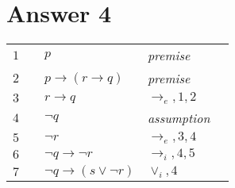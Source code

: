 \documentclass[12pt]{article}
\begin{document}
\section*{Answer 4}
\begin{table}[H]
    \centering
    \begin{tabular}{*5{l}}
         $1$ & & $p$ & \textit{premise} & \\
         $2$ & & $p \rightarrow (r \rightarrow q)$ & \textit{premise} & \\
         $3$ & & $r \rightarrow q$ & $\rightarrow_e, 1, 2$ & \\
          
         \cline{2-5}
         $4$ & \multicolumn{1}{|c}{} & $\neg q$ & \textit{assumption} & \multicolumn{1}{c|}{} \\
         $5$ & \multicolumn{1}{|c}{} & $\neg r$ & $\rightarrow_e, 3, 4$ & \multicolumn{1}{c|}{}\\
         \cline{2-5}
         
         $6$ &  & $\neg q \rightarrow \neg r$ & $\rightarrow_i, 4, 5$ & \\
         $7$ & & $\neg q \rightarrow (s \vee \neg r)$ & $\vee_i, 4$  & \\
    \end{tabular}
\end{table}
\end{document}
